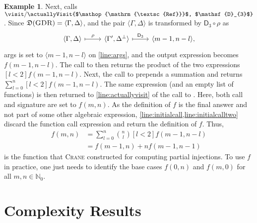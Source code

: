 \documentclass{article}
\theoremstyle{definition}
\newtheorem{example}{Example}
\theoremstyle{remark}
\newcommand{\Done}{\mathsf{D}_{1}}
\newcommand{\Dthree}{\mathsf{D}_{3}}
\DeclareMathOperator{\GDR}{\textsc{GDR}}
\DeclareMathOperator{\Reff}{\textsc{Ref}}
\begin{document}
\begin{example}
  Next, \actuallyVisit{$\land$, $\Dthree$} calls
  $\visit/\actuallyVisit{$\Reff$, $\Dthree$}$. Since
  $\mathfrak{D}(\GDR) = \langle \Gamma, \Delta \rangle$, and the pair
  $\langle\Gamma, \Delta\rangle$ is transformed by $\Dthree{} \circ \rho$ as
  \[
    \begin{tikzcd}
      \langle\Gamma, \Delta\rangle \ar[r, mapsto, "\rho"] & \langle\Gamma', \Delta^{\bot}\rangle \ar[r, mapsto, "\Dthree"] & \langle m-1, n-l \rangle,
    \end{tikzcd}
  \]
  \textsf{args} is set to $\langle m-1, n-l \rangle$ on \cref{line:args}, and
  the output expression becomes $f(m-1, n-l)$. The call to
  \actuallyVisit{$\land$, $\Dthree$} then returns the product of the two
  expressions $[l<2]f(m-1, n-l)$. Next, the call to \actuallyVisit{$\bigvee$,
    $\Done$} prepends a summation and returns $\sum_{l=0}^{n}[l<2]f(m-1,n-l)$.
  The same expression (and an empty list of functions) is then returned to
  \cref{line:actuallyvisit} of the call to \visit{$\GDR$, $\Done$}. Here, both
  \textsf{call} and \textsf{signature} are set to $f(m, n)$. As the definition
  of $f$ is the final answer and not part of some other algebraic expression,
  \cref{line:initialcall,line:initialcalltwo} discard the function call
  expression and return the definition of $f$. Thus,
  \begin{align}
    f(m, n) &= \sum_{l = 0}^{n} \binom{n}{l} [l < 2] f(m-1, n-l)\nonumber \\
            &= f(m-1, n) + n f(m-1, n-1)\label{eq:solution}
  \end{align}
  is the function that \textsc{Crane} constructed for computing partial
  injections. To use $f$ in practice, one just needs to identify the base cases
  $f(0, n)$ and $f(m, 0)$ for all $m, n \in \mathbb{N}_{0}$.
\end{example}

\section{Complexity Results}\label{sec:results}
\end{document}
